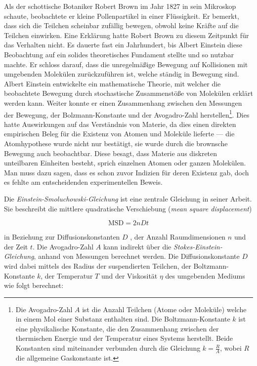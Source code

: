Als der schottische Botaniker Robert Brown im Jahr 1827 in sein Mikroskop schaute, beobachtete er kleine Pollenpartikel in einer Flüssigkeit. Er bemerkt, dass sich die Teilchen scheinbar zufällig bewegen, obwohl keine Kräfte auf die Teilchen einwirken. Eine Erklärung hatte Robert Brown zu diesem Zeitpunkt für das Verhalten nicht. Es dauerte fast ein Jahrhundert, bis Albert Einstein diese Beobachtung auf ein solides theoretisches Fundament stellte und so nutzbar machte. Er schloss darauf, dass die unregelmäßige Bewegung auf Kollisionen mit umgebenden Molekülen zurückzuführen ist, welche ständig in Bewegung sind. Albert Einstein entwickelte ein mathematische Theorie, mit welcher die beobachtete Bewegung durch stochastische Zusammenstöße von Molekülen erklärt werden kann. Weiter konnte er einen Zusammenhang zwischen den Messungen der Bewegung, der Bolzmann-Konstante und der  Avogadro-Zahl herstellen\footnote{Die Avogadro-Zahl $ A $ ist die Anzahl Teilchen (Atome oder Moleküle) welche in einem Mol einer Substanz enthalten sind. Die Boltzmann-Konstante $ k $ ist eine physikalische Konstante, die den Zusammenhang zwischen der thermischen Energie und der Temperatur eines Systems herstellt. Beide Konstanten sind miteinander verbunden durch die Gleichung $ k = \frac{R}{A} $, wobei $ R $ die allgemeine Gaskonstante ist.}. Dies hatte Auswirkungen auf das Verständnis von Materie, da dies einen direkten empirischen Beleg für die Existenz von Atomen und Moleküle lieferte --- die Atomhypothese wurde nicht nur bestätigt, sie wurde durch die brownsche Bewegung auch beobachtbar. Diese besagt, dass Materie aus diskreten unteilbaren Einheiten besteht, sprich einzelnen Atomen oder ganzen Molekülen. Man muss dazu sagen, dass es schon zuvor Indizien für deren Existenz gab, doch es fehlte am entscheidenden experimentellen Beweis.


Die \textit{Einstein-Smoluchowski-Gleichung} ist eine zentrale Gleichung in seiner Arbeit. Sie beschreibt die mittlere quadratische Verschiebung (\textit{mean square displacement})

\begin{equation}
	\mathrm{MSD} = 2nDt
\end{equation}

in Beziehung zur Diffusionskonstanten $ D $ , der Anzahl Raumdimensionen $ n $ und der Zeit $ t $. Die Avogadro-Zahl $ A $ kann indirekt über die \textit{Stokes-Einstein-Gleichung}, anhand von Messungen berechnet werden. Die Diffusionskonstante $ D $ wird dabei mittels des Radius der suspendierten Teilchen, der Boltzmann-Konstante  $ k $, der Temperatur $ T $ und der Viskosität $ \eta $ des umgebenden Mediums wie folgt berechnet:

